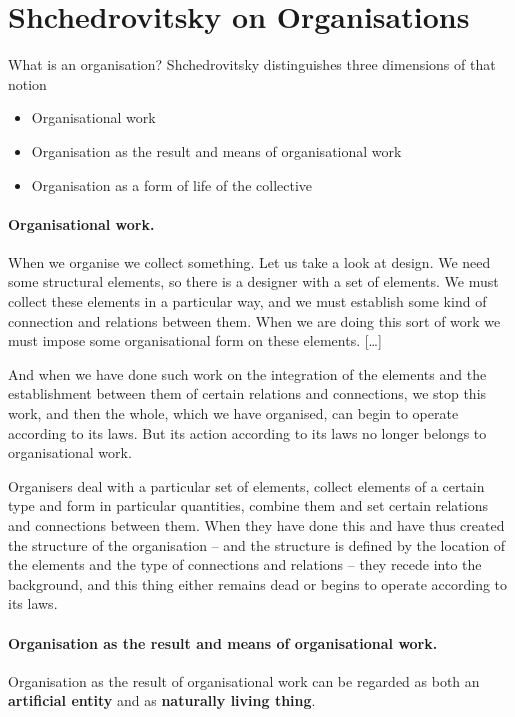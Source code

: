 \documentclass[11pt,a4paper]{article}
\begin{document}
\section{Shchedrovitsky \cite{MSM} on Organisations}

What is an organisation? Shchedrovitsky \cite[p. 30 ff]{MSM} distinguishes
three dimensions of that notion
\begin{itemize}[noitemsep]
\item Organisational work
\item Organisation as the result and means of organisational work
\item Organisation as a form of life of the collective
\end{itemize}

\paragraph{Organisational work.}
When we organise we collect something. Let us take a look at design. We need
some structural elements, so there is a designer with a set of elements. We
must collect these elements in a particular way, and we must establish some
kind of connection and relations between them. When we are doing this sort of
work we must impose some organisational form on these elements. [\ldots]

And when we have done such work on the integration of the elements and the
establishment between them of certain relations and connections, we stop this
work, and then the whole, which we have organised, can begin to operate
according to its laws. But its action according to its laws no longer belongs
to organisational work.

Organisers deal with a particular set of elements, collect elements of a
certain type and form in particular quantities, combine them and set certain
relations and connections between them. When they have done this and have thus
created the structure of the organisation – and the structure is defined by
the location of the elements and the type of connections and relations – they
recede into the background, and this thing either remains dead or begins to
operate according to its laws.

\paragraph{Organisation as the result and means of organisational work.}
Organisation as the result of organisational work can be regarded as both an
\textbf{artificial entity} and as \textbf{naturally living thing}.
\end{document}
